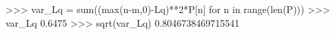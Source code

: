 
>>> var_Lq = sum((max(n-m,0)-Lq)**2*P[n] for n in range(len(P)))
>>> var_Lq
0.6475
>>> sqrt(var_Lq)
0.8046738469715541

